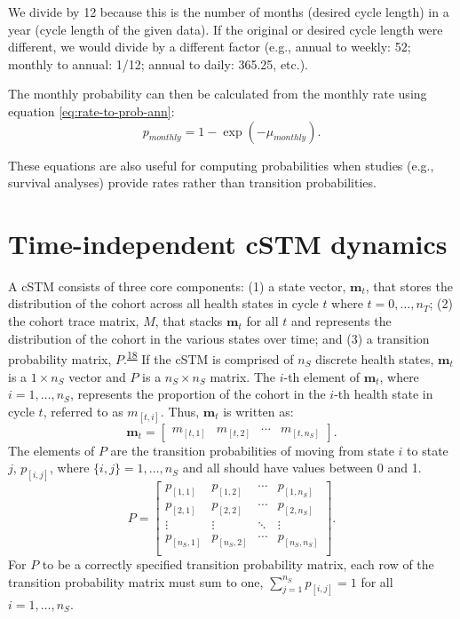 \documentclass[
]{article}
\begin{document}
We divide by 12 because this is the number of months (desired cycle length) in a year (cycle length of the given data). If the original or desired cycle length were different, we would divide by a different factor (e.g., annual to weekly: 52; monthly to annual: 1/12; annual to daily: 365.25, etc.).

The monthly probability can then be calculated from the monthly rate using equation \eqref{eq:rate-to-prob-ann}:
\begin{equation}
    p_{monthly} = 1-\exp{\left(-\mu_{monthly}\right)}.
    \label{eq:rate-to-prob-month}
\end{equation}

These equations are also useful for computing probabilities when studies (e.g., survival analyses) provide rates rather than transition probabilities.

\hypertarget{time-independent-cstm-dynamics}{%
\section{Time-independent cSTM dynamics}\label{time-independent-cstm-dynamics}}

A cSTM consists of three core components: (1) a state vector, \(\mathbf{m}_t\), that stores the distribution of the cohort across all health states in cycle \(t\) where \(t = 0,\ldots, n_T\); (2) the cohort trace matrix, \(M\), that stacks \(\mathbf{m}_t\) for all \(t\) and represents the distribution of the cohort in the various states over time; and (3) a transition probability matrix, \(P\).\textsuperscript{\protect\hyperlink{ref-Iskandar2018a}{18}} If the cSTM is comprised of \(n_S\) discrete health states, \(\mathbf{m}_t\) is a \(1 \times n_S\) vector and \(P\) is a \(n_S \times n_S\) matrix. The \(i\)-th element of \(\mathbf{m}_t\), where \(i = 1,\ldots, n_S\), represents the proportion of the cohort in the \(i\)-th health state in cycle \(t\), referred to as \(m_{[t,i]}\). Thus, \(\mathbf{m}_t\) is written as:
\[
\mathbf{m}_t =
  \begin{bmatrix}
m_{[t,1]} & m_{[t,2]} & \cdots & m_{[t,n_S]}
\end{bmatrix}.
\]
The elements of \(P\) are the transition probabilities of moving from state \(i\) to state \(j\), \(p_{[i,j]}\), where \(\{i,j\} = 1,\ldots, n_S\) and all should have values between 0 and 1.
\[
  P = 
  \begin{bmatrix}
    p_{[1,1]} & p_{[1,2]} & \cdots & p_{[1,n_S]} \\
    p_{[2,1]} & p_{[2,2]} & \cdots & p_{[2,n_S]} \\
    \vdots    & \vdots  & \ddots & \vdots   \\
    p_{[n_S,1]} & p_{[n_S,2]} & \cdots & p_{[n_S,n_S]} \\
  \end{bmatrix}.
\]
For \(P\) to be a correctly specified transition probability matrix, each row of the transition probability matrix must sum to one, \(\sum_{j=1}^{n_S}{p_{[i,j]}} = 1\) for all \(i = 1,\ldots,n_S\).
\end{document}
